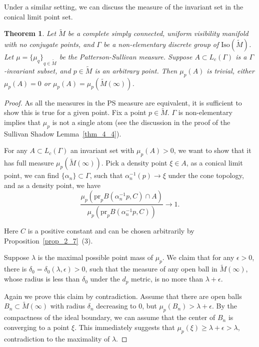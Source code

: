 \documentclass[reqno,11pt]{article}
\newtheorem{theorem}{Theorem}[section]
\theoremstyle{definition}
\theoremstyle{remark}
\numberwithin{equation}{section}
\begin{document}
Under a similar setting, we can discuss the measure of the invariant set in the conical limit point set.

\begin{theorem}\label{thm_5_6}
	Let $\widetilde{M}$ be a complete simply connected, uniform visibility manifold with no conjugate points, and $\Gamma$ be a non-elementary discrete group of $\text{Iso}(\widetilde{M})$. Let $\mu={\{\mu_q\}}_{q\in\widetilde{M}}$ be the Patterson-Sullivan measure. Suppose $A\subset L_c(\Gamma)$ is a $\Gamma$-invariant subset, and $p\in\widetilde{M}$ is an arbitrary point. Then $\mu_p(A)$ is trivial, either $\mu_p(A)=0$ or $\mu_p(A)=\mu_p(\widetilde{M}(\infty))$.
\end{theorem}

\begin{proof}
	As all the measures in the PS measure are equivalent, it is sufficient to show this is true for a given point. Fix a point $p\in\widetilde{M}$. $\Gamma$ is non-elementary implies that $\mu_p$ is not a single atom (see the discussion in the proof of the Sullivan Shadow Lemma~\ref{thm_4_4}).

	For any $A\subset L_c(\Gamma)$ an invariant set with $\mu_p(A)>0$, we want to show that it has full measure $\mu_p(\widetilde{M}(\infty))$. Pick a density point $\xi\in A$, as a conical limit point, we can find $\{\alpha_n\}\subset\Gamma$, such that $\alpha_n^{-1}(p)\to\xi$ under the cone topology, and as a density point, we have
	\begin{equation}\label{equ_5_1}
		\frac{\mu_p(\text{pr}_p B(\alpha_n^{-1}p,C)\cap A)}{\mu_p(\text{pr}_p B(\alpha_n^{-1}p,C))}\to 1.
	\end{equation}

	Here $C$ is a positive constant and can be chosen arbitrarily by Proposition~\ref{prop_2_7}~(3).

	Suppose $\lambda$ is the maximal possible point mass of $\mu_p$. We claim that for any $\epsilon>0$, there is $\delta_0=\delta_0(\lambda,\epsilon)>0$, such that the measure of any open ball in $\widetilde{M}(\infty)$, whose radius is less than $\delta_0$ under the $d_p$ metric, is no more than $\lambda+\epsilon$.

	Again we prove this claim by contradiction. Assume that there are open balls $B_n\subset\widetilde{M}(\infty)$ with radius $\delta_n$ decreasing to $0$, but $\mu_p(B_n)>\lambda+\epsilon$. By the compactness of the ideal boundary, we can assume that the center of $B_n$ is converging to a point $\xi$. This immediately suggests that $\mu_p(\xi)\geq \lambda+\epsilon>\lambda$, contradiction to the maximality of $\lambda$.


\end{proof}
\end{document}
